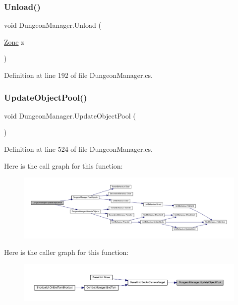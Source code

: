 \subsubsection{\texorpdfstring{Unload()}{Unload()}}
{\footnotesize\ttfamily void Dungeon\+Manager.\+Unload (\begin{DoxyParamCaption}\item[{\mbox{\hyperlink{class_dungeon_manager_a6558d4a01889674bf25c798f1b90a431}{Zone}}}]{z }\end{DoxyParamCaption})}



Definition at line 192 of file Dungeon\+Manager.\+cs.

\mbox{\label{class_dungeon_manager_a980762c66ae4ae92ce3d8caa42f7fe61}} 
\subsubsection{\texorpdfstring{UpdateObjectPool()}{UpdateObjectPool()}}
{\footnotesize\ttfamily void Dungeon\+Manager.\+Update\+Object\+Pool (\begin{DoxyParamCaption}{ }\end{DoxyParamCaption})}



Definition at line 524 of file Dungeon\+Manager.\+cs.

Here is the call graph for this function\+:
\nopagebreak
\begin{figure}[H]
\begin{center}
\leavevmode
\includegraphics[width=350pt]{class_dungeon_manager_a980762c66ae4ae92ce3d8caa42f7fe61_cgraph}
\end{center}
\end{figure}
Here is the caller graph for this function\+:
\nopagebreak
\begin{figure}[H]
\begin{center}
\leavevmode
\includegraphics[width=350pt]{class_dungeon_manager_a980762c66ae4ae92ce3d8caa42f7fe61_icgraph}
\end{center}
\end{figure}


